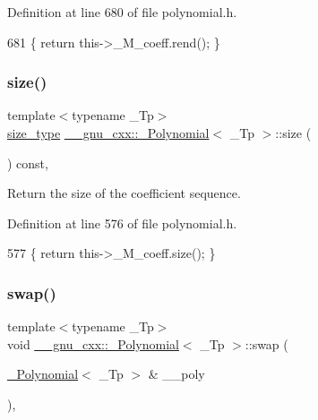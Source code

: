 Definition at line 680 of file polynomial.\+h.


\begin{DoxyCode}
681       \{ \textcolor{keywordflow}{return} this->\_M\_coeff.rend(); \}
\end{DoxyCode}
\mbox{\label{class____gnu__cxx_1_1__Polynomial_aa0ae73f79d58962dc4f1e4df2d2cc0d2}} 
\subsubsection{\texorpdfstring{size()}{size()}}
{\footnotesize\ttfamily template$<$typename \+\_\+\+Tp$>$ \\
\hyperlink{class____gnu__cxx_1_1__Polynomial_a6afe219c123c7a2fdc5abac8a6639053}{size\+\_\+type} \hyperlink{class____gnu__cxx_1_1__Polynomial}{\+\_\+\+\_\+gnu\+\_\+cxx\+::\+\_\+\+Polynomial}$<$ \+\_\+\+Tp $>$\+::size (\begin{DoxyParamCaption}{ }\end{DoxyParamCaption}) const\hspace{0.3cm}{\ttfamily [inline]}, {\ttfamily [noexcept]}}

Return the size of the coefficient sequence. 

Definition at line 576 of file polynomial.\+h.


\begin{DoxyCode}
577       \{ \textcolor{keywordflow}{return} this->\_M\_coeff.size(); \}
\end{DoxyCode}
\mbox{\label{class____gnu__cxx_1_1__Polynomial_aec8b248101f7340d46fbac13b07b45bc}} 
\subsubsection{\texorpdfstring{swap()}{swap()}}
{\footnotesize\ttfamily template$<$typename \+\_\+\+Tp$>$ \\
void \hyperlink{class____gnu__cxx_1_1__Polynomial}{\+\_\+\+\_\+gnu\+\_\+cxx\+::\+\_\+\+Polynomial}$<$ \+\_\+\+Tp $>$\+::swap (\begin{DoxyParamCaption}\item[{\hyperlink{class____gnu__cxx_1_1__Polynomial}{\+\_\+\+Polynomial}$<$ \+\_\+\+Tp $>$ \&}]{\+\_\+\+\_\+poly }\end{DoxyParamCaption})\hspace{0.3cm}{\ttfamily [inline]}, {\ttfamily [noexcept]}}


